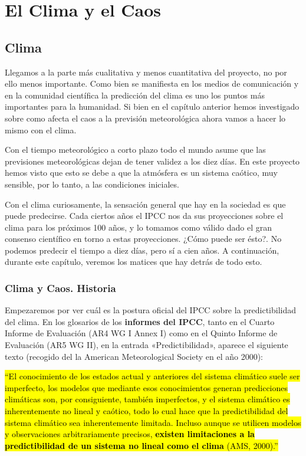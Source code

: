 \documentclass[
  10pt,
  a4paper,
  DIV=11,
  numbers=noendperiod,
  open=any]{scrreprt}
\numberwithin{equation}{chapter}
\numberwithin{equation}{section}
\renewcommand{\[}{\begin{equation}}
\renewcommand{\]}{\end{equation}}
\begin{document}
\part{El Clima y el Caos}

\chapter{Clima}\label{clima}

Llegamos a la parte más cualitativa y menos cuantitativa del proyecto,
no por ello menos importante. Como bien se manifiesta en los medios de
comunicación y en la comunidad científica la predicción del clima es uno
los puntos más importantes para la humanidad. Si bien en el capítulo
anterior hemos investigado sobre como afecta el caos a la previsión
meteorológica ahora vamos a hacer lo mismo con el clima.

Con el tiempo meteorológico a corto plazo todo el mundo asume que las
previsiones meteorológicas dejan de tener validez a los diez días. En
este proyecto hemos visto que esto se debe a que la atmósfera es un
sistema caótico, muy sensible, por lo tanto, a las condiciones
iniciales.

Con el clima curiosamente, la sensación general que hay en la sociedad
es que puede predecirse. Cada ciertos años el IPCC nos da sus
proyecciones sobre el clima para los próximos 100 años, y lo tomamos
como válido dado el gran consenso científico en torno a estas
proyecciones. ¿Cómo puede ser ésto?. No podemos predecir el tiempo a
diez días, pero sí a cien años. A continuación, durante este capítulo,
veremos los matices que hay detrás de todo esto.

\section{Clima y Caos. Historia}\label{clima-y-caos.-historia}

Empezaremos por ver cuál es la postura oficial del IPCC sobre la
predictibilidad del clima. En los glosarios de los \textbf{informes del
IPCC}, tanto en el Cuarto Informe de Evaluación (AR4 WG I Annex I) como
en el Quinto Informe de Evaluación (AR5 WG II), en la entrada
«Predictibilidad», aparece el siguiente texto (recogido del la American
Meteorological Society en el año 2000):

\hl{``El conocimiento de los estados actual y anteriores del sistema
climático suele ser imperfecto, los modelos que mediante esos
conocimientos generan predicciones climáticas son, por consiguiente,
también imperfectos, y el sistema climático es inherentemente no lineal
y caótico, todo lo cual hace que la predictibilidad del sistema
climático sea inherentemente limitada. Incluso aunque se utilicen
modelos y observaciones arbitrariamente precisos, \textbf{existen
limitaciones a la predictibilidad de un sistema no lineal como el clima}
(AMS, 2000).''}
\end{document}
